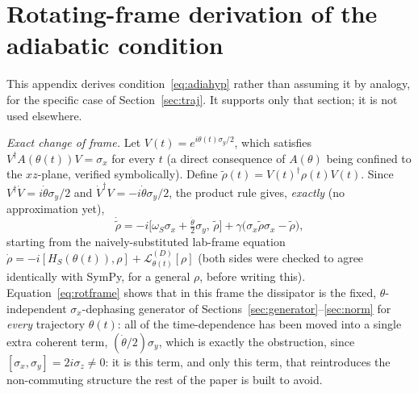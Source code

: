 \documentclass[aps,pra,reprint,superscriptaddress,nofootinbib,longbibliography]{revtex4-2}
\begin{document}
\section{Rotating-frame derivation of the adiabatic condition}
\label{app:rotating}

This appendix derives condition~\eqref{eq:adiahyp} rather than
assuming it by analogy, for the specific case of Section~\ref{sec:traj}.
It supports only that section; it is not used elsewhere.

\emph{Exact change of frame.} Let $V(t)=e^{i\theta(t)\sigma_y/2}$,
which satisfies $V^\dagger A(\theta(t))V=\sigma_x$ for every $t$ (a
direct consequence of $A(\theta)$ being confined to the $xz$-plane,
verified symbolically). Define $\tilde\rho(t)=V(t)^\dagger\rho(t)V(t)$.
Since $V^\dagger\dot V=i\dot\theta\sigma_y/2$ and
$\dot V^\dagger V=-i\dot\theta\sigma_y/2$, the product rule gives,
\emph{exactly} (no approximation yet),
\begin{equation}
\dot{\tilde\rho} = -i\bigl[\omega_S\sigma_x+\tfrac{\dot\theta}{2}\sigma_y,\,\tilde\rho\bigr]
+\gamma\bigl(\sigma_x\tilde\rho\sigma_x-\tilde\rho\bigr),
\label{eq:rotframe}
\end{equation}
starting from the naively-substituted lab-frame equation
$\dot\rho=-i[H_S(\theta(t)),\rho]+\mathcal L^{(D)}_{\theta(t)}[\rho]$
(both sides were checked to agree identically with SymPy, for a
general $\rho$, before writing this). Equation~\eqref{eq:rotframe}
shows that in this frame the dissipator is the fixed, $\theta$-independent
$\sigma_x$-dephasing generator of Sections~\ref{sec:generator}--\ref{sec:norm}
for \emph{every} trajectory $\theta(t)$: all of the time-dependence has
been moved into a single extra coherent term, $(\dot\theta/2)\sigma_y$,
which is exactly the obstruction, since
$[\sigma_x,\sigma_y]=2i\sigma_z\neq0$: it is this term, and only this
term, that reintroduces the non-commuting structure the rest of the
paper is built to avoid.
\end{document}
